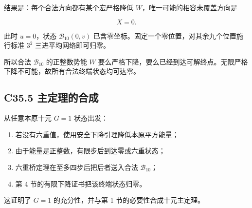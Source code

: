 {结果是：每个合法方向都有某个宏严格降低} \(W\){，唯一可能的相容未覆盖方向是}

\[
X=0.
\]

{此时} \(u=0\){，状态} \(\mathcal B_{10}(0,v)\) {已含零坐标。固定一个零位置，对其余九个位置施行标准} \(3^2\) {三进平均网络即可归零。}

{所以合法} \(\mathcal B_{10}\) {的正整数势能} \(W\) {要么严格下降，要么已经到达可解终点。无限严格下降不可能，故所有合法终端状态均可达零。}

\subsection*{\texorpdfstring{{C35.5} {主定理的合成}}{C35.5 主定理的合成}}\label{C35-h240}

{从任意本原十元} \(G=1\) {状态出发：}

\begin{enumerate}
\def\labelenumi{\arabic{enumi}.}
\tightlist
\item
  {若没有六重值，使用安全下降引理降低本原平方能量；}
\item
  {由于能量是正整数，有限步后到达零或六重状态；}
\item
  {六重桥定理在至多四步后把后者送入合法} \(\mathcal B_{10}\){；}
\item
  {第} {4} {节的有限下降证书把该终端状态归零。}
\end{enumerate}

{这证明了} \(G=1\) {的充分性，并与第} {1} {节的必要性合成十元主定理。}
